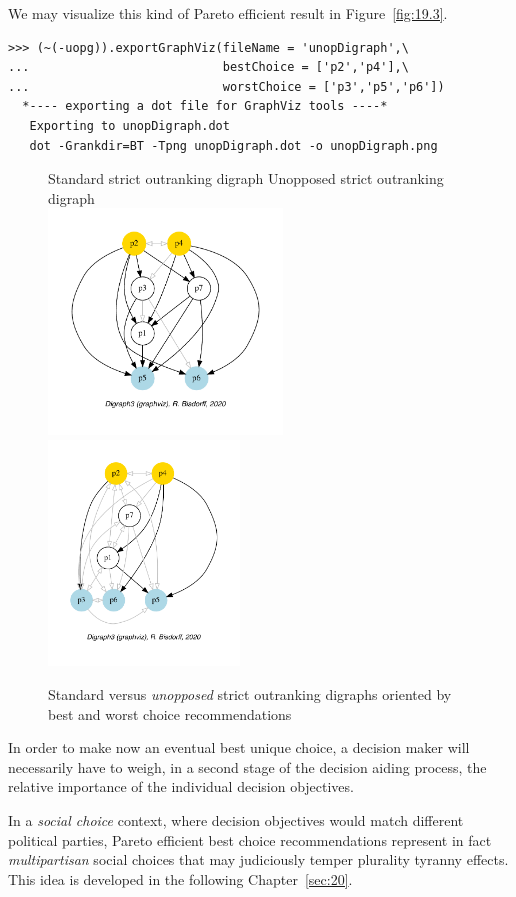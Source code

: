 We may visualize this kind of Pareto efficient result in Figure~\vref{fig:19.3}.
\begin{lstlisting}
>>> (~(-uopg)).exportGraphViz(fileName = 'unopDigraph',\
...                           bestChoice = ['p2','p4'],\
...                           worstChoice = ['p3','p5','p6'])
  *---- exporting a dot file for GraphViz tools ----*
   Exporting to unopDigraph.dot
   dot -Grankdir=BT -Tpng unopDigraph.dot -o unopDigraph.png
\end{lstlisting}
\begin{figure}[ht]
  Standard strict outranking digraph \hfill Unopposed strict outranking digraph \\
  \includegraphics[height=6cm]{Figures/19-1-stdg.pdf}\hfill
  \includegraphics[height=6cm]{Figures/19-3-unopDigraph.pdf}
\caption{Standard versus \emph{unopposed} strict outranking digraphs oriented by best and worst choice recommendations} 
\label{fig:19.3}       %
\end{figure}

In order to make now an eventual best unique choice, a decision maker will necessarily have to weigh, in a second stage of the decision aiding process, the relative importance of the individual decision objectives.

In a \emph{social choice} context, where decision objectives would match different political parties, Pareto efficient best choice recommendations represent in fact \emph{multipartisan} social choices that may judiciously temper plurality tyranny effects. This idea is developed in the following Chapter~\ref{sec:20}.

